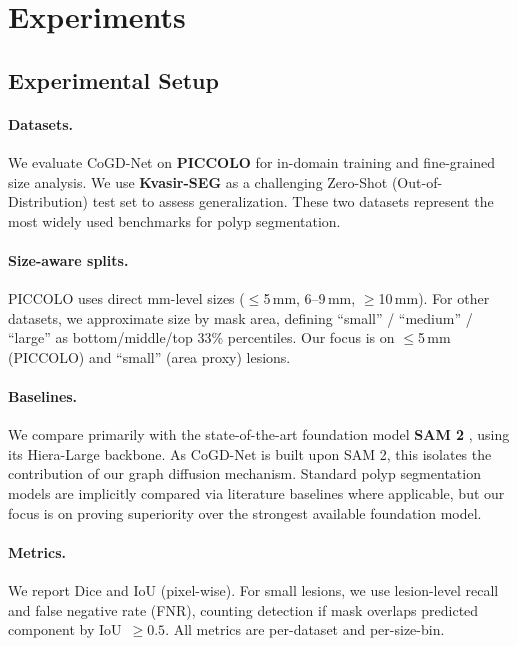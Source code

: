\documentclass{article}
\begin{document}
\section{Experiments}

\subsection{Experimental Setup}

\paragraph{Datasets.}
We evaluate CoGD-Net on \textbf{PICCOLO} \cite{SanchezPeralta2020PICCOLO} for in-domain training and fine-grained size analysis. We use \textbf{Kvasir-SEG} \cite{Jha2020KvasirSEG} as a challenging Zero-Shot (Out-of-Distribution) test set to assess generalization. These two datasets represent the most widely used benchmarks for polyp segmentation.

\paragraph{Size-aware splits.}
PICCOLO uses direct mm-level sizes ($\leq$5\,mm, 6--9\,mm, $\geq$10\,mm). For other datasets, we approximate size by mask area, defining ``small'' / ``medium'' / ``large'' as bottom/middle/top 33\% percentiles. Our focus is on $\leq$5\,mm (PICCOLO) and ``small'' (area proxy) lesions.

\paragraph{Baselines.}

We compare primarily with the state-of-the-art foundation model \textbf{SAM 2} \cite{Ravi2024SAM2}, using its Hiera-Large backbone. As CoGD-Net is built upon SAM 2, this isolates the contribution of our graph diffusion mechanism. Standard polyp segmentation models are implicitly compared via literature baselines where applicable, but our focus is on proving superiority over the strongest available foundation model.

\paragraph{Metrics.}
We report Dice and IoU (pixel-wise). For small lesions, we use lesion-level recall and false negative rate (FNR), counting detection if mask overlaps predicted component by IoU~$\geq 0.5$. All metrics are per-dataset and per-size-bin.
\end{document}
